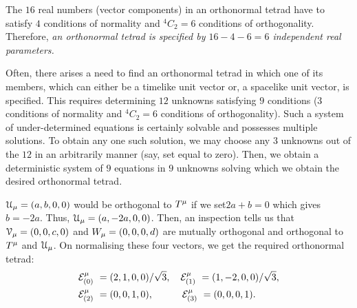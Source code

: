 The $16$ real numbers (vector components) in an 
orthonormal tetrad  have to satisfy  $4$ conditions 
of normality and ${}^4 C_2  =6$ conditions of 
orthogonality. Therefore, \textit{an orthonormal 
tetrad is specified by $16-4-6 = 6$ independent real 
parameters.}

Often, there arises a need to find an orthonormal 
tetrad in which one of its members, which can either be 
a timelike unit vector or, a spacelike unit vector, is 
specified. This requires determining $12$ unknowns 
satisfying $9$ conditions ($3$ conditions of 
normality and ${}^4 C_2 =6$ conditions of 
orthogonality). Such a system of under-determined 
equations is certainly solvable and possesses multiple 
solutions. To obtain any one such solution, we 
may choose any $3$ unknowns out of the $12$ in an 
arbitrarily manner (say, set equal to zero). Then, we 
obtain a deterministic system of $ 9 $ equations in 
$9$ unknowns  solving which we obtain the desired 
orthonormal tetrad.


\soln $\EuScript{U}_{{\mu}}=(a,b,0,0)$ would be orthogonal 
to $T^{{\mu}}$ if we set\lbk $2a+b=0$ which gives 
$b=-2a$. Thus, $\EuScript{U}_{{\mu}}=(a,-2a,0,0)$. Then, 
an inspection tells us that  $\EuScript{V}_{{\mu}} 
=(0,0,c,0)$ and $ W_{{\mu}} =(0,0,0,d)$ are mutually 
orthogonal and orthogonal to $T^{{\mu}}$ and 
$\EuScript{U}_{{\mu}}$. On normalising these four vectors, 
we get the required orthonormal tetrad:
\begin{align*}
\mathcal{E}_{ {({0})}\ }^{{\mu}} & =(2,1,0,0)/\sqrt{3}, \quad\mathcal{E}_{ {({1})}\ }^{{\mu}} 
=(1,-2,0,0)/\sqrt{3}, \\
 \mathcal{E}_{ {({2})}\ }^{{\mu}}&=(0,0,1,0) ,\qquad 
\quad\mathcal{E}_{ {({3})}\ }^{{\mu}}=(0,0,0,1).  
\end{align*}\ebxup

